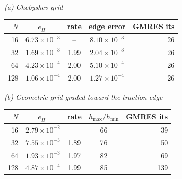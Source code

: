 \textit{(a) Chebyshev grid}\\[2pt]
\begin{tabular}{r cc c r}
\toprule
$N$ & $e_{H^1}$ & rate & edge error & GMRES its\\
\midrule
16 & $6.73{\times}10^{-3}$ & -- & $8.10{\times}10^{-3}$ & 26\\
32 & $1.69{\times}10^{-3}$ & 1.99 & $2.04{\times}10^{-3}$ & 26\\
64 & $4.23{\times}10^{-4}$ & 2.00 & $5.10{\times}10^{-4}$ & 26\\
128 & $1.06{\times}10^{-4}$ & 2.00 & $1.27{\times}10^{-4}$ & 26\\
\bottomrule
\end{tabular}

\medskip
\textit{(b) Geometric grid graded toward the traction edge}\\[2pt]
\begin{tabular}{r cc c r}
\toprule
$N$ & $e_{H^1}$ & rate & $h_{\max}/h_{\min}$ & GMRES its\\
\midrule
16 & $2.79{\times}10^{-2}$ & -- & 66 & 39\\
32 & $7.55{\times}10^{-3}$ & 1.89 & 76 & 50\\
64 & $1.93{\times}10^{-3}$ & 1.97 & 82 & 69\\
128 & $4.87{\times}10^{-4}$ & 1.99 & 85 & 139\\
\bottomrule
\end{tabular}
